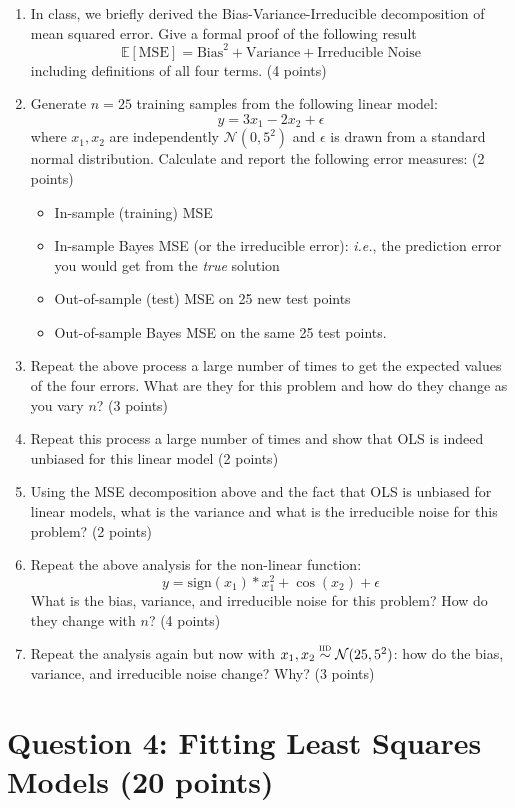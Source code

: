 \documentclass[10pt]{article}
\newcommand{\E}{\mathbb{E}}
\begin{document}
\begin{enumerate}[label={(\alph*)}]
    \item In class, we briefly derived the Bias-Variance-Irreducible decomposition of mean squared error. Give a formal proof of the following result
    \[\E[\text{MSE}] = \text{Bias}^2 + \text{Variance} + \text{Irreducible Noise}\]
    including definitions of all four terms. (4 points)
    \item Generate $n=25$ training samples from the following linear model: \[y = 3x_1 - 2x_2 + \epsilon\]
    where $x_1, x_2$ are independently $\mathcal{N}(0, 5^2)$ and $\epsilon$ is drawn from a standard normal distribution. Calculate and report the following error measures: (2 points)
    \begin{itemize}
        \item In-sample (training) MSE
        \item In-sample Bayes MSE (or the irreducible error): \emph{i.e.}, the prediction error you would get from the \emph{true} solution
        \item Out-of-sample (test) MSE on 25 new test points
        \item Out-of-sample Bayes MSE on the same 25 test points.
    \end{itemize}
    \item Repeat the above process a large number of times to get the expected values of the four errors. What are they for this problem and how do they change as you vary $n$? (3 points)
    \item Repeat this process a large number of times and show that OLS is indeed unbiased for this linear model (2 points)
    \item Using the MSE decomposition above and the fact that OLS is unbiased for linear models, what is the variance and what is the irreducible noise for this problem? (2 points)
    \item Repeat the above analysis for the non-linear function: 
    \[y = \text{sign}(x_1) * x_1^2 + \cos(x_2) + \epsilon \]
    What is the bias, variance, and irreducible noise for this problem? How do they change with $n$? (4 points)
    \item Repeat the analysis again but now with $x_1, x_2 \buildrel{\textsc{iid}}\over\sim \mathcal{N}(25, 5^2)$: how do the bias, variance, and irreducible noise change? Why? (3 points)
\end{enumerate}

\section*{Question 4: Fitting Least Squares Models (20 points)}
\end{document}
